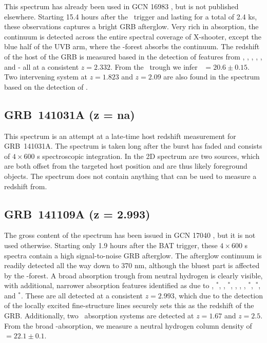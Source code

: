 \documentclass[longauth]{aa}    %
\begin{document}
This spectrum has already been used in GCN 16983 \citep{GCN16983}, but is
not published elsewhere. Starting 15.4 hours after the \swift~trigger and
lasting for a total of 2.4 ks, these observations captures a bright GRB
afterglow. Very rich in absorption, the continuum is detected across the entire
spectral coverage of X-shooter, except the blue half of the UVB arm, where the
\lya-forest absorbs the continuum. The redshift of the host of the GRB is
measured based in the detection of features from \lya, \SIii, \civ, \cii, \feii,
and \mgii - all at a consistent $z = 2.332$. From the \lya~trough we infer
\nh~$=20.6 \pm 0.15$. Two intervening system at $z = 1.823$ and $z = 2.09$ are
also found in the spectrum based on the detection of \civ.

\subsection{GRB~141031A  (z = na)}	\label{141031}

This spectrum is an attempt at a late-time host redshift measurement for
GRB~141031A. The spectrum is taken long after the burst has faded and consists
of $4\times600$ s spectroscopic integration. In the 2D spectrum are two sources,
which are both offset from the targeted host position and are thus likely foreground
objects. The spectrum does not contain anything that can be used to measure a
redshift from.

\subsection{GRB~141109A (z = 2.993)}\label{141109}

The gross content of the spectrum has been issued in GCN 17040 \citep{GCN17040},
but it is not used otherwise. Starting only 1.9 hours after the BAT trigger,
these $4\times600$ s spectra contain a high signal-to-noise GRB afterglow. The
afterglow continuum is readily detected all the way down to 370 nm, although
the bluest part is affected by the \lya-forest. A broad absorption trough from
neutral hydrogen is clearly visible, with additional, narrower absorption
features identified as due to \SIii, \SIii$^*$, \cii, \cii$^*$, \SIiv, \civ,
\feii, \feii$^*$, \oi$^*$, and \nii$^*$. These are all detected at a consistent
$z = 2.993$, which due to the detection of the locally excited fine-structure
lines securely sets this as the redshift of the GRB. Additionally, two
\mgii~absorption systems are detected at $z = 1.67$ and $z=2.5$. From the broad
\lya-absorption, we measure a neutral hydrogen column density of \nh~$=22.1 \pm
0.1$.
\end{document}
